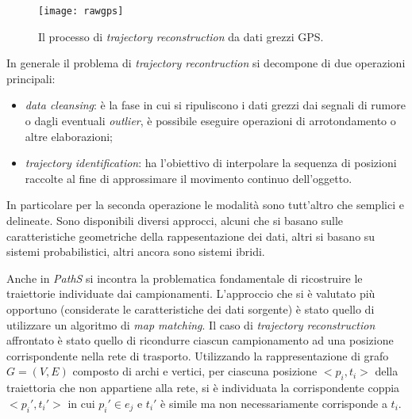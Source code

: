 \begin{figure}[h]
  \centering
  \texttt{[image: rawgps]}
  \caption{\footnotesize{Il processo di \emph{trajectory reconstruction} da dati grezzi GPS.}}
  \label{fig:rawgps}
\end{figure}

In generale il problema di \emph{trajectory recontruction} si decompone di due operazioni principali:
\begin{itemize}
\item \emph{data cleansing}: è la fase in cui si ripuliscono i dati grezzi dai segnali di rumore o dagli eventuali \emph{outlier}, è possibile eseguire operazioni di arrotondamento o altre elaborazioni;
\item \emph{trajectory identification}: ha l'obiettivo di interpolare la sequenza di posizioni raccolte al fine di approssimare il movimento continuo dell'oggetto.
\end{itemize}
In particolare per la seconda operazione le modalità sono tutt'altro che semplici e delineate. Sono disponibili diversi approcci, alcuni che si basano sulle caratteristiche geometriche della rappesentazione dei dati, altri si basano su sistemi probabilistici, altri ancora sono sistemi ibridi.

Anche in \emph{PathS} si incontra la problematica fondamentale di ricostruire le traiettorie individuate dai campionamenti. L'approccio che si è valutato più opportuno (considerate le caratteristiche dei dati sorgente) è stato quello di utilizzare un algoritmo di \emph{map matching}.
Il caso di \emph{trajectory reconstruction} affrontato è stato quello di ricondurre ciascun campionamento ad una posizione corrispondente nella rete di trasporto. Utilizzando la rappresentazione di grafo $G=(V,E)$ composto di archi e vertici, per ciascuna posizione $<p_i, t_i>$ della traiettoria che non appartiene alla rete, si è individuata la corrispondente coppia $<p_i', t_i'>$ in cui $p_i' \in e_j$ e $t_i'$ è simile ma non necessariamente corrisponde a $t_i$.

